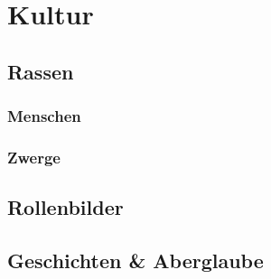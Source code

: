 \chapter{Kultur}
\section{Rassen}
\subsection{Menschen}
\subsection{Zwerge}

\section{Rollenbilder}
\section{Geschichten \& Aberglaube}